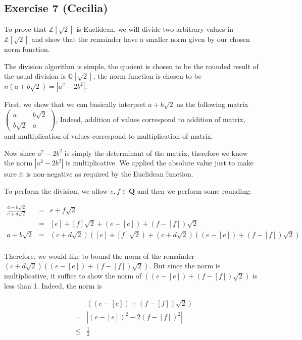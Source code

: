 \subsection*{Exercise 7 (Cecilia)}
To prove that $ \mathbb{Z}[\sqrt{2}] $ is Euclidean, we will divide two arbitrary values in $ \mathbb{Z}[\sqrt{2}] $ and show that the remainder have a smaller norm given by our chosen norm function. 

The division algorithm is simple, the quoient is chosen to be the rounded result of the usual division is $ \mathbb{Q}[\sqrt{2}] $, the norm function is chosen to be $ n(a + b\sqrt{2}) = |a^2 - 2b^2| $.

First, we show that we can basically interpret $ a + b\sqrt{2} $ as the following matrix $\left(\begin{array}{cc}a & b\sqrt{2} \\ b\sqrt{2} & a \end{array}\right) $, Indeed, addition of values correspond to addition of matrix, and multiplication of values correspond to multiplication of matrix.

Now since $ a^2 - 2b^2 $ is simply the determinant of the matrix, therefore we know the norm $ |a^2 - 2b^2| $ is multiplicative. We applied the absolute value just to make sure it is non-negative as required by the Euclidean function.

To perform the division, we allow $ e, f \in \mathbf{Q} $ and then we perform some rounding:

\begin{eqnarray*}
  \frac{a+b\sqrt{2}}{c + d\sqrt{2}} &=& e + f\sqrt{2} \\
                                    &=& [e] + [f]\sqrt{2} + (e - [e]) + (f - [f])\sqrt{2} \\
  a+b\sqrt{2} &=& (c + d\sqrt{2})([e] + [f]\sqrt{2}) + (c + d\sqrt{2})((e - [e]) + (f - [f])\sqrt{2}) \\
\end{eqnarray*}

Therefore, we would like to bound the norm of the remainder $ (c + d\sqrt{2})((e - [e]) + (f - [f])\sqrt{2}) $. But since the norm is multiplicative, it suffice to show the norm of $ ((e - [e]) + (f - [f])\sqrt{2}) $ is less than 1. Indeed, the norm is

\begin{eqnarray*}
  & & ((e - [e]) + (f - [f])\sqrt{2}) \\
  &=& |(e - [e])^2 - 2(f - [f])^2| \\
  &\le& \frac{1}{2}
\end{eqnarray*}

